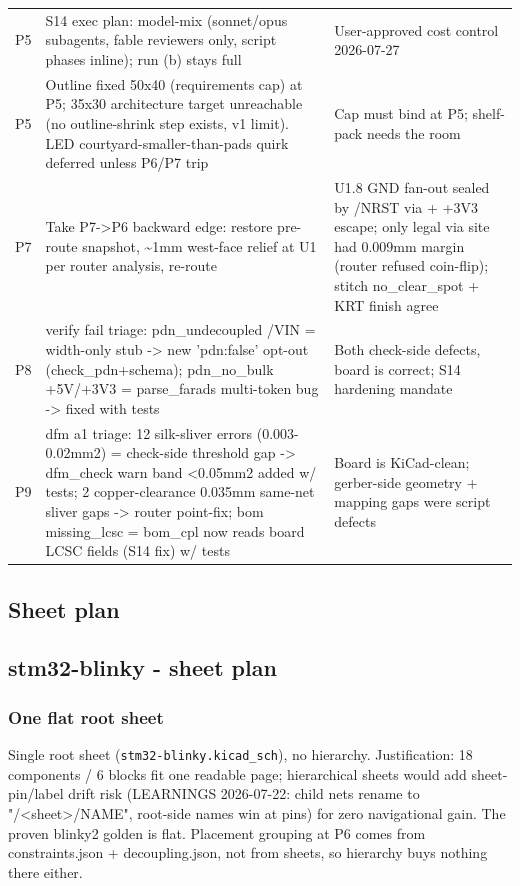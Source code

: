 \documentclass[11pt,a4paper]{article}
\begin{document}
{\begin{longtable}{lp{5.2cm}p{7.2cm}}
P5 & S14 exec plan: model-mix (sonnet/opus subagents, fable reviewers only, script phases inline); run (b) stays full & User-approved cost control 2026-07-27 \\
P5 & Outline fixed 50x40 (requirements cap) at P5; 35x30 architecture target unreachable (no outline-shrink step exists, v1 limit). LED courtyard-smaller-than-pads quirk deferred unless P6/P7 trip & Cap must bind at P5; shelf-pack needs the room \\
P7 & Take P7-\textgreater{}P6 backward edge: restore pre-route snapshot, \textasciitilde{}1mm west-face relief at U1 per router analysis, re-route & U1.8 GND fan-out sealed by /NRST via + +3V3 escape; only legal via site had 0.009mm margin (router refused coin-flip); stitch no\_clear\_spot + KRT finish agree \\
P8 & verify fail triage: pdn\_undecoupled /VIN = width-only stub -\textgreater{} new 'pdn:false' opt-out (check\_pdn+schema); pdn\_no\_bulk +5V/+3V3 = parse\_farads multi-token bug -\textgreater{} fixed with tests & Both check-side defects, board is correct; S14 hardening mandate \\
P9 & dfm a1 triage: 12 silk-sliver errors (0.003-0.02mm2) = check-side threshold gap -\textgreater{} dfm\_check warn band \textless{}0.05mm2 added w/ tests; 2 copper-clearance 0.035mm same-net sliver gaps -\textgreater{} router point-fix; bom missing\_lcsc = bom\_cpl now reads board LCSC fields (S14 fix) w/ tests & Board is KiCad-clean; gerber-side geometry + mapping gaps were script defects \\
\bottomrule
\end{longtable}
}
\subsection*{Sheet plan}
\subsection*{stm32-blinky - sheet plan}
\subsubsection*{One flat root sheet}
Single root sheet (\texttt{stm32-blinky.kicad\_sch}), no hierarchy. Justification: 18 components / 6 blocks fit one readable page; hierarchical sheets would add sheet-pin/label drift risk (LEARNINGS 2026-07-22: child nets rename to "/\textless{}sheet\textgreater{}/NAME", root-side names win at pins) for zero navigational gain. The proven blinky2 golden is flat. Placement grouping at P6 comes from constraints.json + decoupling.json, not from sheets, so hierarchy buys nothing there either.
\end{document}
